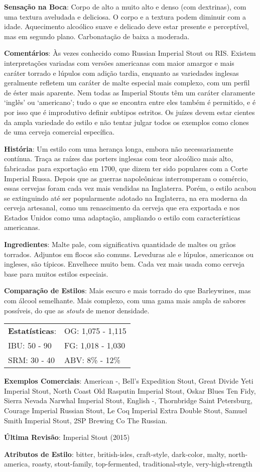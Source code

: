 \textbf{Sensação na Boca}: Corpo de alto a muito alto e denso (com dextrinas), com uma textura aveludada e deliciosa. O corpo e a textura podem diminuir com a idade. Aquecimento alcoólico suave e delicado deve estar presente e perceptível, mas em segundo plano. Carbonatação de baixa a moderada.

\textbf{Comentários}: Às vezes conhecido como Russian Imperial Stout ou RIS. Existem interpretações variadas com versões americanas com maior amargor e mais caráter torrado e lúpulos com adição tardia, enquanto as variedades inglesas geralmente refletem um caráter de malte especial mais complexo, com um perfil de éster mais aparente. Nem todas as Imperial Stouts têm um caráter claramente ‘inglês’ ou ‘americano’; tudo o que se encontra entre eles também é permitido, e é por isso que é improdutivo definir subtipos estritos. Os juízes devem estar cientes da ampla variedade do estilo e não tentar julgar todos os exemplos como clones de uma cerveja comercial específica.

\textbf{História}: Um estilo com uma herança longa, embora não necessariamente contínua. Traça as raízes das porters inglesas com teor alcoólico mais alto, fabricadas para exportação em 1700, que dizem ter sido populares com a Corte Imperial Russa. Depois que as guerras napoleônicas interromperam o comércio, essas cervejas foram cada vez mais vendidas na Inglaterra. Porém, o estilo acabou se extinguindo até ser popularmente adotado na Inglaterra, na era moderna da cerveja artesanal, como um renascimento da cerveja que era exportada e nos Estados Unidos como uma adaptação, ampliando o estilo com características americanas.

\textbf{Ingredientes}: Malte pale, com significativa quantidade de maltes ou grãos torrados. Adjuntos em flocos são comuns. Leveduras ale e lúpulos, americanos ou ingleses, são típicos. Envelhece muito bem. Cada vez mais usada como cerveja base para muitos estilos especiais.

\textbf{Comparação de Estilos}: Mais escuro e mais torrado do que Barleywines, mas com álcool semelhante. Mais complexo, com uma gama mais ampla de sabores possíveis, do que as \textit{stouts} de menor densidade.

\begin{tabular}{@{}p{35mm}p{35mm}@{}}
  \textbf{Estatísticas}: & OG: 1,075 - 1,115 \\
  IBU: 50 - 90  & FG: 1,018 - 1,030 \\
  SRM: 30 - 40  & ABV: 8\% - 12\%
\end{tabular}

\textbf{Exemplos Comerciais}: American -, Bell's Expedition Stout, Great Divide Yeti Imperial Stout, North Coast Old Rasputin Imperial Stout, Oskar Blues Ten Fidy, Sierra Nevada Narwhal Imperial Stout, English -, Thornbridge Saint Petersburg, Courage Imperial Russian Stout, Le Coq Imperial Extra Double Stout, Samuel Smith Imperial Stout, 2SP Brewing Co The Russian.

\textbf{Última Revisão}: Imperial Stout (2015)

\textbf{Atributos de Estilo}: bitter, british-isles, craft-style, dark-color, malty, north-america, roasty, stout-family, top-fermented, traditional-style, very-high-strength
